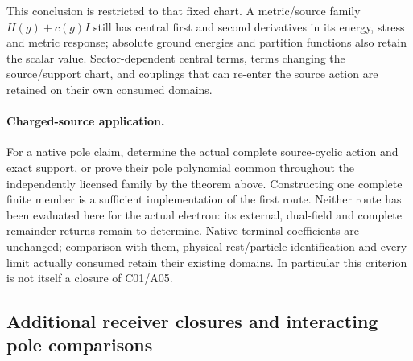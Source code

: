 \documentclass[12pt,a4paper]{article}
\begin{document}
This conclusion is restricted to that fixed chart.  A metric/source family
$H(g)+c(g)I$ still has central first and second derivatives in its
energy, stress and metric response; absolute ground energies and partition
functions also retain the scalar value.  Sector-dependent central terms,
terms changing the source/support chart, and couplings that can re-enter
the source action are retained on their own consumed domains.

\paragraph{Charged-source application.}
For a native pole claim, determine the actual complete source-cyclic action
and exact support, or prove their pole polynomial common throughout the
independently licensed family by the theorem above.  Constructing one
complete finite member is a sufficient implementation of the first route.
Neither route has been evaluated here for the actual electron: its external,
dual-field and complete remainder returns remain to determine.  Native
terminal coefficients are unchanged; comparison with them, physical
rest/particle identification and every limit actually consumed retain
their existing domains.  In particular this criterion is not itself a
closure of C01/A05.





\subsection{Additional receiver closures and interacting pole comparisons}
\label{p4:app:v2169-polynomial-comparisons}
\end{document}
